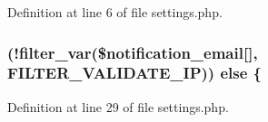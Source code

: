 Definition at line 6 of file settings.\+php.

\subsubsection[{\texorpdfstring{else}{else}}]{ (!filter\+\_\+var(\$notification\+\_\+email\mbox{[}\textquotesingle{}\mbox{]}, F\+I\+L\+T\+E\+R\+\_\+\+V\+A\+L\+I\+D\+A\+T\+E\+\_\+\+IP)) else \{}\hypertarget{installation_2pages_2settings_8php_a76278e213f097f9a2cf8e8a3759df6f1}{}\label{installation_2pages_2settings_8php_a76278e213f097f9a2cf8e8a3759df6f1}


Definition at line 29 of file settings.\+php.

